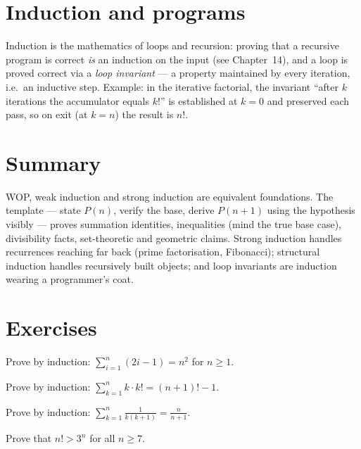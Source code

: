 \section{Induction and programs}

Induction is the mathematics of loops and recursion: proving that a
recursive program is correct \emph{is} an induction on the input (see
Chapter~14), and a loop is proved correct via a \emph{loop invariant} ---
a property maintained by every iteration, i.e.\ an inductive step. Example:
in the iterative factorial, the invariant ``after $k$ iterations the
accumulator equals $k!$'' is established at $k = 0$ and preserved each pass,
so on exit (at $k = n$) the result is $n!$.

\section{Summary}

WOP, weak induction and strong induction are equivalent foundations. The
template --- state $P(n)$, verify the base, derive $P(n+1)$ using the
hypothesis visibly --- proves summation identities, inequalities (mind the
true base case), divisibility facts, set-theoretic and geometric claims.
Strong induction handles recurrences reaching far back (prime
factorisation, Fibonacci); structural induction handles recursively built
objects; and loop invariants are induction wearing a programmer's coat.

\section*{Exercises}

\begin{exercise}{\easy}
Prove by induction: $\sum_{i=1}^{n} (2i - 1) = n^{2}$ for $n \geq 1$.
\end{exercise}

\begin{exercise}{\easy}
Prove by induction: $\sum_{k=1}^{n} k \cdot k! = (n+1)! - 1$.
\end{exercise}

\begin{exercise}{\easy}
Prove by induction: $\sum_{k=1}^{n} \frac{1}{k(k+1)} = \frac{n}{n+1}$.
\end{exercise}

\begin{exercise}{\medium}
Prove that $n! > 3^{n}$ for all $n \geq 7$.
\end{exercise}

